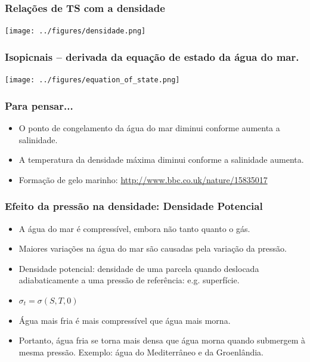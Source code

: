 \begin{frame}
\frametitle{Relações de TS com a densidade}
    \begin{center}
        \texttt{[image: ../figures/densidade.png]}
    \end{center}
\end{frame}

\begin{frame}
\frametitle{\small{Isopicnais -- derivada da equação de estado da água do mar.}}
    \begin{center}
        \texttt{[image: ../figures/equation\_of\_state.png]}
    \end{center}
\end{frame}


\begin{frame}
\frametitle{Para pensar...}
    \footnotesize{
    \begin{itemize}[<+-| alert@+>]
    \item O ponto de congelamento da água do mar diminui conforme aumenta a
          salinidade.
    \item A temperatura da densidade máxima diminui conforme a
          salinidade aumenta.
    \item Formação de gelo marinho:
    \url{http://www.bbc.co.uk/nature/15835017}
    \end{itemize}
    }
\end{frame}


\begin{frame}
\frametitle{Efeito da pressão na densidade: Densidade Potencial}
    \footnotesize{
    \begin{itemize}[<+-| alert@+>]
    \item A água do mar é compressível, embora não tanto quanto o gás.
    \item Maiores variações na água do mar são causadas pela variação da
          pressão.
    \item Densidade potencial: densidade de uma parcela quando deslocada
          adiabaticamente a uma pressão de referência: e.g. superfície.
    \item $\sigma_t = \sigma(S, T, 0)$
    \item Água mais fria é mais compressível que água mais morna.
    \item Portanto, água fria se torna mais densa que água morna quando
          submergem à mesma pressão. Exemplo: água do Mediterrâneo e da
          Groenlândia.
    \end{itemize}
    }
\end{frame}


